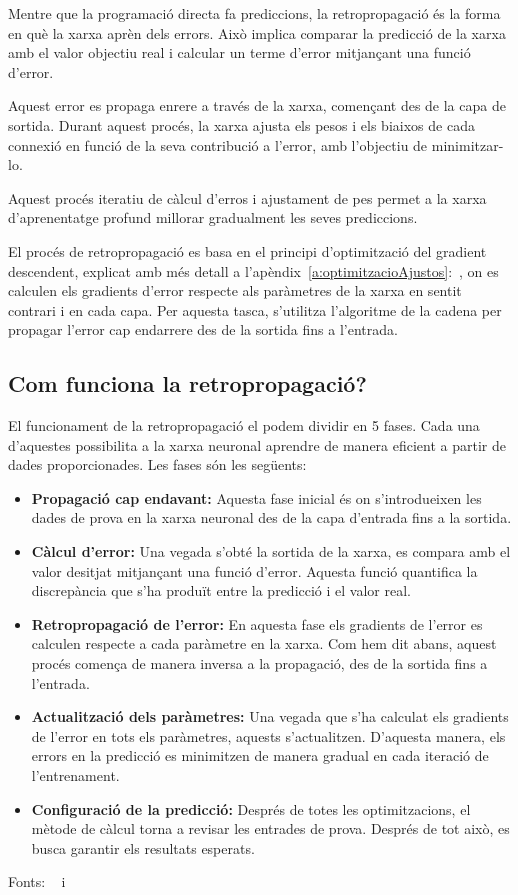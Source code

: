 Mentre que la programació directa fa prediccions, la retropropagació és la forma en què la xarxa aprèn dels errors. Això implica comparar la predicció de la xarxa amb el valor objectiu real i calcular un terme d'error mitjançant una funció d'error.

Aquest error es propaga enrere a través de la xarxa, començant des de la capa de sortida. Durant aquest procés, la xarxa ajusta els pesos i els biaixos de cada connexió en funció de la seva contribució a l'error, amb l'objectiu de minimitzar-lo.

Aquest procés iteratiu de càlcul d'erros i ajustament de pes permet a la xarxa d'aprenentatge profund millorar gradualment les seves prediccions.

El procés de retropropagació es basa en el principi d'optimització del gradient descendent, explicat amb més detall a l'apèndix~\ref{a:optimitzacioAjustos}:~, on es calculen els gradients d'error respecte als paràmetres de la xarxa en sentit contrari i en cada capa. Per aquesta tasca, s'utilitza l'algoritme de la cadena per propagar l'error cap endarrere des de la sortida fins a l'entrada.

\subsection{Com funciona la retropropagació?}

El funcionament de la retropropagació el podem dividir en 5 fases. Cada una d'aquestes possibilita a la xarxa neuronal aprendre de manera eficient a partir de dades proporcionades. Les fases són les següents:

\begin{itemize}
    \item \textbf{Propagació cap endavant:} Aquesta fase inicial és on s'introdueixen les dades de prova en la xarxa neuronal des de la capa d'entrada fins a la sortida.

    \item \textbf{Càlcul d'error:} Una vegada s'obté la sortida de la xarxa, es compara amb el valor desitjat mitjançant una funció d'error. Aquesta funció quantifica la discrepància que s'ha produït entre la predicció i el valor real.

    \item \textbf{Retropropagació de l'error:} En aquesta fase els gradients de l'error es calculen respecte a cada paràmetre en la xarxa. Com hem dit abans, aquest procés comença de manera inversa a la propagació, des de la sortida fins a l'entrada.

    \item \textbf{Actualització dels paràmetres:} Una vegada que s'ha calculat els gradients de l'error en tots els paràmetres, aquests s'actualitzen. D'aquesta manera, els errors en la predicció es minimitzen de manera gradual en cada iteració de l'entrenament.

    \item \textbf{Configuració de la predicció:} Després de totes les optimitzacions, el mètode de càlcul torna a revisar les entrades de prova. Després de tot això, es busca garantir els resultats esperats.
\end{itemize}

Fonts: ~\cite{valencia} i~\cite{Retropropagacio}

